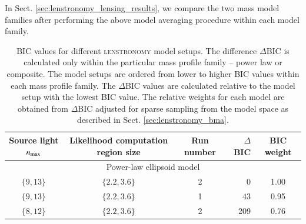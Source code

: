 \documentclass[longauth]{aa}
\newcommand{\reply}[1]{{{#1}}}
\begin{document}
In Sect. \ref{sec:lenstronomy_lensing_results}, we compare the two mass model families after performing the above model averaging procedure within each model family.

\begin{table}
\caption{\label{tab:lenstronomy_bic_values}
        BIC values for different \textsc{lenstronomy} model setups. The difference $\Delta$BIC is calculated only within the particular mass profile family -- power law or composite. The model setups are ordered from \reply{lower to higher} BIC values within each mass profile family. \reply{The $\Delta$BIC values are calculated relative to the model setup with the lowest BIC value.} The relative weights for each model are obtained from $\Delta$BIC adjusted for sparse sampling from the model space as described in Sect. \ref{sec:lenstronomy_bma}.
        }
\begin{tabular}{cccrc}
\hline
Source light $n_{\rm max}$ & Likelihood computation region size & Run number & $\Delta$BIC & BIC weight \\
\hline
\multicolumn{5}{c}{Power-law ellipsoid model} \\
\hline
$\{9, 13\}$ & $\{ 2.2,3.6 \}$ & 2 & 0 & 1.00 \\
$\{9, 13\}$ & $\{ 2.2,3.6 \}$ & 1 & 43 & 0.95 \\
$\{8, 12\}$ & $\{ 2.2,3.6 \}$ & 2 & 209 & 0.76 \\

\end{tabular}
\end{table}
\end{document}
